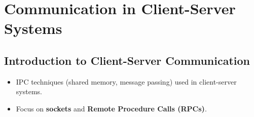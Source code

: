 \section{Communication in Client-Server Systems}\label{sec:3.8}

\subsection{Introduction to Client-Server Communication}
\begin{itemize}
    \item IPC techniques (shared memory, message passing) used in client-server systems.
    \item Focus on \textbf{sockets} and \textbf{Remote Procedure Calls (RPCs)}.
\end{itemize}

